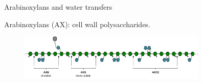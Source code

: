\documentclass[10pt]{beamer}
\begin{document}
\begin{frame}{Arabinoxylans and water transfers}

  \alert{Arabinoxylans (AX)}: cell wall polysaccharides.
  \vspace{-0.2cm}
  \begin{figure}[ht]
    \centering
    \includegraphics[width=0.8\textwidth]{fig/AX}
  \end{figure}


  \vspace{-0.4cm}
  


\end{frame}
\end{document}
